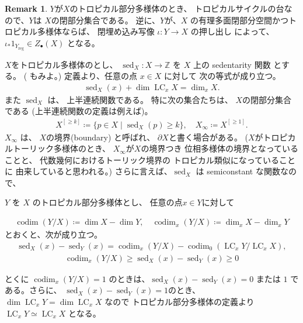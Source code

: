 \documentclass[a4paper,dvipdfmx,reqno,12pt]{amsart}
\theoremstyle{definition}
\newtheorem{remark}[theorem]{Remark}
\newcommand{\deq}{\coloneqq}
\newcommand{\opn}[1]{\operatorname{#1}}
\numberwithin{equation}{section}
\begin{document}
\begin{remark}
$Y$が$X$のトロピカル部分多様体のとき、
トロピカルサイクルの台なので、$Y$は
$X$の閉部分集合である。
逆に、$Y$が、$X$
の有理多面閉部分空間かつトロピカル多様体ならば、
閉埋め込み写像 $\iota\colon Y\to X$ 
の押し出し
\cite[]{demedrano2023chern}
によって、$\iota_*1_{Y_{\mathrm{reg}}}\in Z_{\bullet}(X)$
となる。
\end{remark}

$X$をトロピカル多様体のとし、
$\opn{sed}_X\colon 
X\to \mathbb{Z}$ を
$X$ 上の sedentarity 関数
\cite[Definition 7.2.6]{mikhalkin2018tropical}
とする。
(\cite[Definition 2.4]{demedrano2023chern}
もみよ。)
定義より、任意の点 $x\in X$ に対して
次の等式が成り立つ。
\begin{align}
\opn{sed}_X(x)+\dim \opn{LC}_x X=\dim_x X.
\end{align}
また $\opn{sed}_X$ は、
上半連続関数である。
特に次の集合たちは、
$X$の閉部分集合である
(上半連続関数の定義は例えば\cite[p.287]{MR463157})。
\begin{align}
X^{[\geq k]}\deq \{p\in X\mid \opn{sed}_X(p)\geq k\},
\quad 
X_{\infty}\deq X^{[\geq 1]}.
\end{align}
$X_{\infty}$ は、
$X$の境界(boundary)
と呼ばれ、
$\partial X$と書く場合がある。
($X$がトロピカルトーリック多様体のとき、
$X_{\infty}$が$X$の境界つき
位相多様体の境界となっていることと、
代数幾何におけるトーリック境界の
トロピカル類似になっていることに
由来していると思われる。)
さらに言えば、$\opn{sed}_X$ は
semiconstant な関数なので、




$Y$ を $X$ 
のトロピカル部分多様体とし、
任意の点$x\in Y$に対して

\begin{align}
\opn{codim}(Y/X)\deq \dim X -\dim Y,\quad 
\opn{codim}_x(Y/X)\deq \dim_x X -\dim_x Y
\end{align}
とおくと、次が成り立つ。
\begin{align}
\opn{sed}_X(x)-\opn{sed}_Y(x)=
\opn{codim}_x(Y/X)-\opn{codim}_0(\opn{LC}_x Y/\opn{LC}_xX),
\end{align}
\begin{align}
\opn{codim}_x(Y/X) \geq 
\opn{sed}_X(x)-\opn{sed}_Y(x)\geq 0
\end{align}

とくに $\opn{codim}_x(Y/X)=1$
のときは、$\opn{sed}_X(x)-\opn{sed}_Y(x)=0$ または
$1$ である。さらに、
$\opn{sed}_X(x)-\opn{sed}_Y(x)=1$のとき、
$\dim \opn{LC}_x Y=\dim \opn{LC}_x X$
なので トロピカル部分多様体の定義より
$\opn{LC}_x Y\simeq \opn{LC}_x X$
となる。
\end{document}
